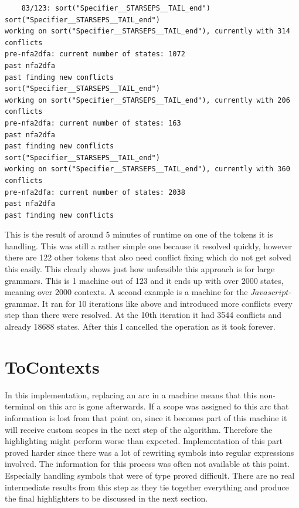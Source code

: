 \begin{lstlisting}
	83/123: sort("Specifier__STARSEPS__TAIL_end")
sort("Specifier__STARSEPS__TAIL_end")
working on sort("Specifier__STARSEPS__TAIL_end"), currently with 314 conflicts
pre-nfa2dfa: current number of states: 1072
past nfa2dfa
past finding new conflicts
sort("Specifier__STARSEPS__TAIL_end")
working on sort("Specifier__STARSEPS__TAIL_end"), currently with 206 conflicts
pre-nfa2dfa: current number of states: 163
past nfa2dfa
past finding new conflicts
sort("Specifier__STARSEPS__TAIL_end")
working on sort("Specifier__STARSEPS__TAIL_end"), currently with 360 conflicts
pre-nfa2dfa: current number of states: 2038
past nfa2dfa
past finding new conflicts
\end{lstlisting}
This is the result of around 5 minutes of runtime on one of the tokens  it is handling. This was still a rather simple one because it resolved quickly, however there are 122 other tokens that also need conflict fixing which do not get solved this easily. This clearly shows just how unfeasible this approach is for large grammars. This is 1 machine out of 123 and it ends up with over 2000 states, meaning over 2000 contexts. A second example is a machine for the $Javascript$-grammar. It ran for 10 iterations like above and introduced more conflicts every step than there were resolved. At the 10th iteration it had 3544 conflicts and already 18688 states. After this I cancelled the operation as it took forever.



\section{ToContexts}
In this implementation, replacing an arc in a machine means that this non-terminal on this arc is gone afterwards. If a scope was assigned to this arc that information is lost from that point on, since it becomes part of this machine it will receive custom scopes in the next step of the algorithm. Therefore the highlighting might perform worse than expected. Implementation of this part proved harder since there was a lot of rewriting symbols into regular expressions involved. The information for this process was often not available at this point. Especially handling symbols that were of type  proved difficult. There are no real intermediate results from this step as they tie together everything and produce the final highlighters to be discussed in the next section.

\pagebreak

